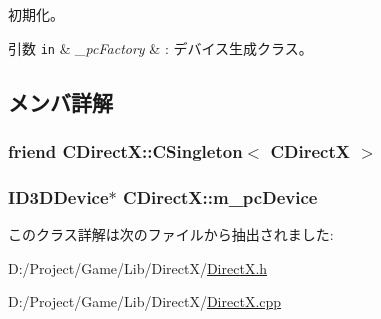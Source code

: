 初期化。 


\begin{DoxyParams}[1]{引数}
\mbox{\tt in}  & {\em \+\_\+pc\+Factory} & \+: デバイス生成クラス。 \\
\hline
\end{DoxyParams}


\subsection{メンバ詳解}
\hypertarget{class_c_direct_x_a7c51dd8b68b56ffa5bed852e4dd13a92}{}
\subsubsection[{C\+Singleton$<$ C\+Direct\+X $>$}]{\setlength{\rightskip}{0pt plus 5cm}friend {\bf C\+Direct\+X\+::\+C\+Singleton}$<$ {\bf C\+Direct\+X} $>$\hspace{0.3cm}{\ttfamily [private]}}\label{class_c_direct_x_a7c51dd8b68b56ffa5bed852e4dd13a92}
\hypertarget{class_c_direct_x_a6ecdada46fbabcb5535cede3a96fdbe3}{}
\subsubsection[{m\+\_\+pc\+Device}]{\setlength{\rightskip}{0pt plus 5cm}I\+D3\+D\+Device$\ast$ C\+Direct\+X\+::m\+\_\+pc\+Device\hspace{0.3cm}{\ttfamily [private]}}\label{class_c_direct_x_a6ecdada46fbabcb5535cede3a96fdbe3}


このクラス詳解は次のファイルから抽出されました\+:\begin{DoxyCompactItemize}
\item 
D\+:/\+Project/\+Game/\+Lib/\+Direct\+X/\hyperlink{_direct_x_8h}{Direct\+X.\+h}\item 
D\+:/\+Project/\+Game/\+Lib/\+Direct\+X/\hyperlink{_direct_x_8cpp}{Direct\+X.\+cpp}\end{DoxyCompactItemize}
